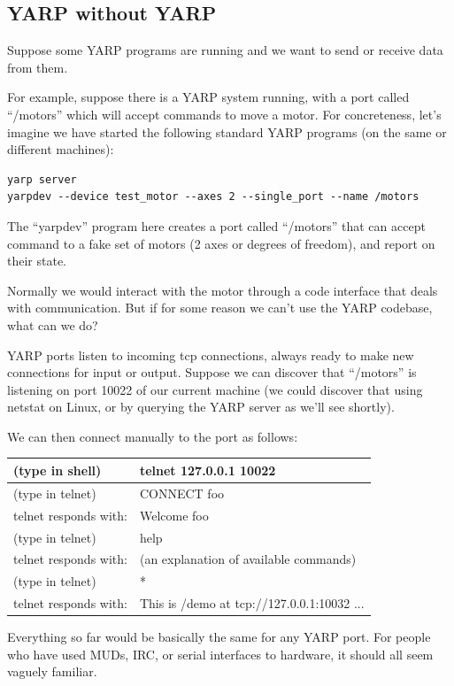 \subsection{YARP without YARP}

Suppose some YARP programs are running and we want to send or
receive data from them.

For example, suppose there is a YARP system running, with a 
port called ``/motors'' which will accept commands to move a
motor.  For concreteness, let's imagine we have started the
following standard YARP programs (on the same or different 
machines):

\begin{verbatim}
yarp server
yarpdev --device test_motor --axes 2 --single_port --name /motors
\end{verbatim}

The ``yarpdev'' program here creates a port called ``/motors'' that can
accept command to a fake set of motors (2 axes or degrees of freedom),
and report on their state.

Normally we would interact with the motor through a code
interface that deals with communication.  But if for 
some reason we can't use the YARP codebase, what can
we do?

YARP ports listen to incoming tcp connections, always ready to make
new connections for input or output.  Suppose we can discover that
``/motors'' is listening on port 10022 of our current machine (we could
discover that using netstat on Linux, or by querying the YARP server
as we'll see shortly).

We can then connect manually to the port as follows:

\begin{tabular}{|l|l|}
\hline
(type in shell) & telnet 127.0.0.1 10022 \\
\hline
(type in telnet) & CONNECT foo \\
\hline
telnet responds with: & Welcome foo \\
\hline
(type in telnet) & help \\
\hline
telnet responds with: & (an explanation of available commands) \\
\hline
(type in telnet) & * \\
\hline
telnet responds with: & This is /demo at tcp://127.0.0.1:10032 ... \\
\hline
\end{tabular}

Everything so far would be basically the same for any YARP port.
For people who have used MUDs, IRC, or serial interfaces to hardware,
it should all seem vaguely familiar.

